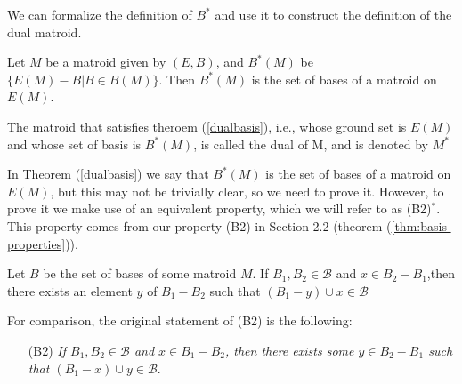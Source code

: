 

We can formalize the definition of $B^*$ and use it to construct the definition of the dual matroid.

\begin{theorem}\label{dualbasis}
    Let $M$ be a matroid given by $(E,B)$, and $B^*(M)$ be $\{E(M) - B|B\in B(M)\}$. Then $B^*(M)$ is the set of bases of a matroid on $E(M)$.
\end{theorem}

\begin{defn}
     The matroid that satisfies theroem (\ref{dualbasis}), i.e., whose ground set is $E(M)$ and whose set of basis is $B^*(M)$, is called the dual of M, and is denoted by $M^*$
\end{defn}

In Theorem (\ref{dualbasis}) we say that $B^*(M)$ is the set of bases of a matroid on $E(M)$, but this may not be trivially clear, so we need to prove it. However, to prove it we make use of an equivalent property, which we will refer to as (B2)$^*$. This property comes from our property (B2) in Section 2.2 (theorem (\ref{thm:basis-properties})).

\begin{lemma}[(B2)$^*$]\label{B2Dual}
    Let $B$ be the set of bases of some matroid $M$. If $B_1, B_2 \in \mathcal{B}$ and $x \in B_2 - B_1$,then there exists an element $y$ of $B_1 - B_2$ such that $(B_1 - y) \cup x \in \mathcal{B}$
\end{lemma}

For comparison, the original statement of (B2) is the following:
\begin{enumerate}
    \item[(B2)] \textit{If $B_1,B_2\in \mathcal{B}$ and $x\in B_1 - B_2$, then there exists some $y\in B_2 - B_1$ such that $(B_1 - x)\cup y \in \mathcal{B}$}.
\end{enumerate}

